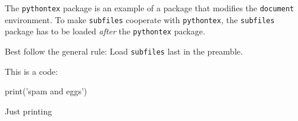\documentclass[main]{subfiles}
\begin{document}
The \verb|pythontex| package is an example of a package that modifies
the \verb|document| environment. To make \verb|subfiles| cooperate
with \verb|pythontex|, the \verb|subfiles| package has to be loaded
\emph{after} the \verb|pythontex| package.

Best follow the general rule: Load \verb|subfiles| last in the preamble.


This is a code:
\begin{pyverbatim}
print('spam and eggs')
\end{pyverbatim}

Just printing 
\end{document}
